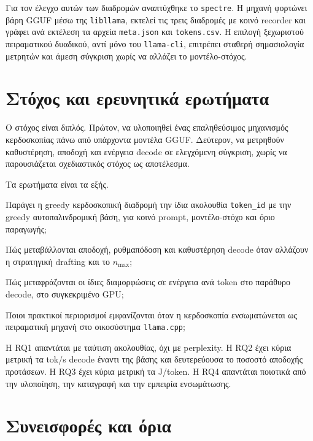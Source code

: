 \documentclass[a4paper,12pt]{report}
\theoremstyle{plain}
\theoremstyle{definition}
\theoremstyle{remark}
\begin{document}
Για τον έλεγχο αυτών των διαδρομών αναπτύχθηκε το \texttt{spectre}. Η μηχανή
φορτώνει βάρη GGUF μέσω της \texttt{libllama}, εκτελεί τις τρεις διαδρομές με
κοινό recorder και γράφει ανά εκτέλεση τα αρχεία \texttt{meta.json} και
\texttt{tokens.csv}. Η επιλογή ξεχωριστού πειραματικού δυαδικού, αντί μόνο
του \texttt{llama-cli}, επιτρέπει σταθερή σημασιολογία μετρητών και άμεση
σύγκριση χωρίς να αλλάζει το μοντέλο-στόχος.

\section{Στόχος και ερευνητικά ερωτήματα}
\label{sec:rq}

Ο στόχος είναι διπλός. Πρώτον, να υλοποιηθεί ένας επαληθεύσιμος μηχανισμός
κερδοσκοπίας πάνω από υπάρχοντα μοντέλα GGUF. Δεύτερον, να μετρηθούν
καθυστέρηση, αποδοχή και ενέργεια decode σε ελεγχόμενη σύγκριση, χωρίς να
παρουσιάζεται σχεδιαστικός στόχος ως αποτέλεσμα.

Τα ερωτήματα είναι τα εξής.

\begin{description}[style=nextline,leftmargin=1.6em,font=\bfseries]
  \item[RQ1.]
    Παράγει η greedy κερδοσκοπική διαδρομή την ίδια ακολουθία \texttt{token\_id}
    με την greedy αυτοπαλινδρομική βάση, για κοινό prompt, μοντέλο-στόχο και
    όριο παραγωγής;
  \item[RQ2.]
    Πώς μεταβάλλονται αποδοχή, ρυθμαπόδοση και καθυστέρηση decode όταν αλλάζουν
    η στρατηγική drafting και το \(n_{\max}\);
  \item[RQ3.]
    Πώς μεταφράζονται οι ίδιες διαμορφώσεις σε ενέργεια ανά token στο παράθυρο
    decode, στο συγκεκριμένο GPU;
  \item[RQ4.]
    Ποιοι πρακτικοί περιορισμοί εμφανίζονται όταν η κερδοσκοπία ενσωματώνεται
    ως πειραματική μηχανή στο οικοσύστημα \texttt{llama.cpp};
\end{description}

Η RQ1 απαντάται με ταύτιση ακολουθίας, όχι με perplexity. Η RQ2 έχει κύρια
μετρική τα tok/s decode έναντι της βάσης και δευτερεύουσα το ποσοστό αποδοχής
προτάσεων. Η RQ3 έχει κύρια μετρική τα J/token. Η RQ4 απαντάται ποιοτικά από
την υλοποίηση, την καταγραφή και την εμπειρία ενσωμάτωσης.

\section{Συνεισφορές και όρια}
\end{document}
